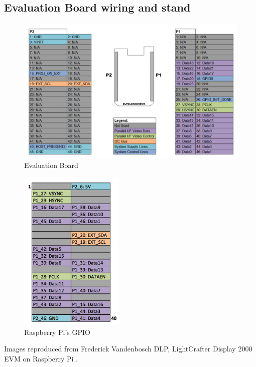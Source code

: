 \begin{appendices}
\clearpage

\setcounter{figure}{0}
\section{Evaluation Board wiring and stand}
\begin{figure}[ht!]%
    \centering
    \includegraphics[width=14cm]{images/wiring1}%
    \caption{Evaluation Board}%
\end{figure}

\begin{figure}[ht!]%
    \centering
    \includegraphics[width=5cm]{images/wiring2}%
    \caption{Raspberry Pi's GPIO}%
\end{figure}

Images reproduced from Frederick Vandenbosch DLP, LightCrafter Display 2000 EVM on Raspberry Pi \cite{projector}.
\clearpage


\end{appendices}
